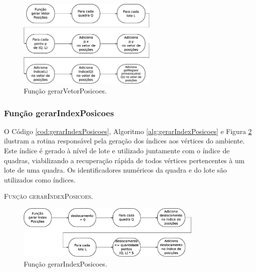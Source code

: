 \begin{figure}[H]
  \centering
  \includegraphics[width=0.6\textwidth]{Figuras/Simula/Fluxos/gerarVetorPosicoes.eps}
  \caption{Função gerarVetorPosicoes.}
  \label{fig:gerarVetorPosicoes}
\end{figure} 

\newpage

\subsubsection{Função gerarIndexPosicoes}

O Código \ref{cod:gerarIndexPosicoes}, Algoritmo \ref{alg:gerarIndexPosicoes} e Figura \ref{fig:gerarIndexPosicoes} ilustram a rotina responsável pela geração dos índices aos vértices do ambiente. Este índice é gerado à nível de lote e utilizado juntamente com o índice de quadras, viabilizando a recuperação rápida de todos vértices pertencentes à um lote de uma quadra. Os identificadores numéricos da quadra e do lote são utilizados como índices. 



\begin{algorithm}[H]
   \SetAlgoLined   
   
   \caption{\textsc{Função gerarIndexPosicoes.}}
   \label{alg:gerarIndexPosicoes}
\end{algorithm}

\begin{figure}[H]
  \centering
  \includegraphics[width=0.8\textwidth]{Figuras/Simula/Fluxos/gerarIndexPosicoes.eps}
  \caption{Função gerarIndexPosicoes.}
  \label{fig:gerarIndexPosicoes}
\end{figure} 

